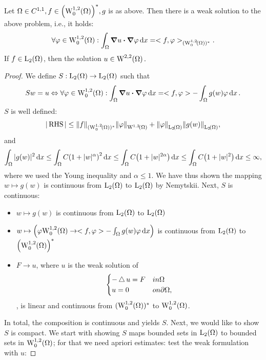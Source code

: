 \documentclass{article}
\begin{document}
\begin{example}
	\begin{theorem}[Existence]
		Let $ \Omega \in C^{1,1}, f \in \qty(\WkpzeroSet[1][2]{\Omega})^{*}, g$ is as above. Then there is a weak solution to the above problem, i.e., it holds:
		\[
			\forall \varphi \in \WkpzeroSet[1][2]{\Omega}: \int_{\Omega}\grad u \vdot \grad \varphi\dd{x} = <f,\varphi>_{(\WkpzeroSet[1][2]{\Omega})^{*}}.
		\]
		If $f \in \LpSet[2]{\Omega}$, then the solution $u \in \WkpSet[2][2]{\Omega}.$
	\end{theorem}
	\begin{proof}
		We define $S: \LpSet[2]{\Omega} \to \LpSet[2]{\Omega}$ such that
		\[
			Sw = u \Leftrightarrow \forall \varphi \in \WkpzeroSet[1][2]{\Omega}: \int_{\Omega}\grad u \vdot \grad \varphi\dd{x} = <f,\varphi> - \int_{\Omega}g(w) \varphi\dd{x}.
		\]
		$S$ is well defined:
		\[
			|\, \text{RHS} \,| \leq \norm{f}_{(\WkpzeroSet[1][2]{\Omega})^{*}} \norm{\varphi}_{\WkpSet[1][2]{\Omega}} + \norm{\varphi}_{\LpSet[2]{\Omega}} \norm{g(w)}_{\LpSet[2]{\Omega}},
		\] and
		\[
			\int_{\Omega}|g(w)|^{2}\dd{x} \leq \int_{\Omega}C\qty(1+|w|^{\alpha})^{2}\dd{x} \leq \int_{\Omega}C\qty(1+|w|^{2 \alpha})\dd{x} \leq \int_{\Omega}C\qty(1+|w|^2)\dd{x} \leq \infty,
		\]
		where we used the Young inequality and $\alpha \leq 1$. We have thus shown the mapping $w \mapsto g(w)$ is continuous from $\LpSet[2]{\Omega}$ to $\LpSet[2]{\Omega}$ by Nemytskii.
		Next, $S$ is continuous: 
		\begin{itemize}
			\item $w \mapsto g(w)$ is continuous from $\LpSet[2]{\Omega}$ to $\LpSet[2]{\Omega}$
			\item $w \mapsto \qty(\varphi \WkpzeroSet[1][2]{\Omega} \to <f,\varphi>-\int_{\Omega}g(w) \varphi\dd{x})$ is continuous from $\LpSet[2]{\Omega}$ to $\qty(\WkpzeroSet[1][2]{\Omega})^{*}$
			\item $F \to u$, where $u$ is the weak solution of
				\[
					\begin{cases}
						-\operatorname{\bigtriangleup} u = F & in \Omega \\
						u = 0 & on \partial \Omega,
					\end{cases}
				\]
				, is linear and continuous from $(\WkpzeroSet[1][2]{\Omega})^{*}$ to $\WkpzeroSet[1][2]{\Omega}$.
		\end{itemize}
		In total, the composition is continuous and yields $S$. Next, we would like to show $S$ is compact. We start with showing $S$ maps bounded sets in $\LpSet[2]{\Omega}$ to bounded sets in $\WkpzeroSet[1][2]{\Omega}$; for that we need apriori estimates: test the weak formulation with $u$:

\end{proof}
\end{example}
\end{document}
